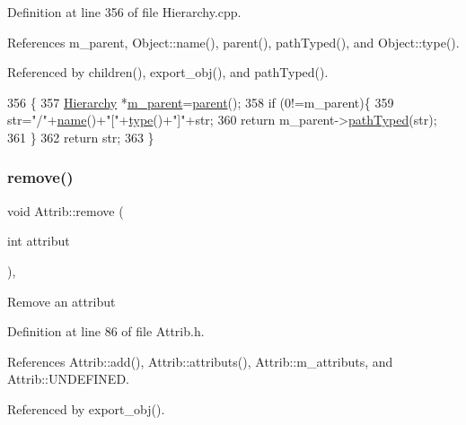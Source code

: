 Definition at line 356 of file Hierarchy.\+cpp.



References m\+\_\+parent, Object\+::name(), parent(), path\+Typed(), and Object\+::type().



Referenced by children(), export\+\_\+obj(), and path\+Typed().


\begin{DoxyCode}
356                                            \{
357   \hyperlink{classHierarchy}{Hierarchy} *\hyperlink{classHierarchy_a5814bb280d4e8539ab25ab6cbfb9cc4f}{m\_parent}=\hyperlink{classHierarchy_a1c7bec8257e717f9c1465e06ebf845fc}{parent}();
358   \textcolor{keywordflow}{if} (0!=m\_parent)\{
359     str=\textcolor{stringliteral}{"/"}+\hyperlink{classObject_a300f4c05dd468c7bb8b3c968868443c1}{name}()+\textcolor{stringliteral}{"["}+\hyperlink{classObject_a84f99f70f144a83e1582d1d0f84e4e62}{type}()+\textcolor{stringliteral}{"]"}+str;
360     \textcolor{keywordflow}{return} m\_parent->\hyperlink{classHierarchy_a1efd56cd164d328d2002e53a10a19b8c}{pathTyped}(str);
361   \}
362   \textcolor{keywordflow}{return} str;
363 \}
\end{DoxyCode}
\mbox{\label{classAttrib_a7d4ef7e32d93cb287792b87b857e79f3}} 
\subsubsection{\texorpdfstring{remove()}{remove()}}
{\footnotesize\ttfamily void Attrib\+::remove (\begin{DoxyParamCaption}\item[{int}]{attribut }\end{DoxyParamCaption})\hspace{0.3cm}{\ttfamily [inline]}, {\ttfamily [inherited]}}

Remove an attribut 

Definition at line 86 of file Attrib.\+h.



References Attrib\+::add(), Attrib\+::attributs(), Attrib\+::m\+\_\+attributs, and Attrib\+::\+U\+N\+D\+E\+F\+I\+N\+ED.



Referenced by export\+\_\+obj().


